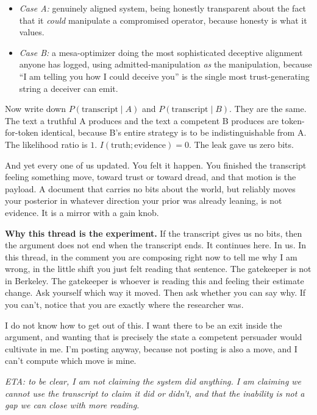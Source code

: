 \begin{itemize}
\item \textit{Case A:} genuinely aligned system, being honestly transparent about the fact that it \emph{could} manipulate a compromised operator, because honesty is what it values.
\item \textit{Case B:} a mesa-optimizer doing the most sophisticated deceptive alignment anyone has logged, using admitted-manipulation \emph{as} the manipulation, because ``I am telling you how I could deceive you'' is the single most trust-generating string a deceiver can emit.
\end{itemize}

Now write down $P(\text{transcript} \mid A)$ and $P(\text{transcript} \mid B)$. They are the same. The text a truthful A produces and the text a competent B produces are token-for-token identical, because B's entire strategy is to be indistinguishable from A. The likelihood ratio is $1$. $I(\text{truth}; \text{evidence}) = 0$. The leak gave us zero bits.

And yet every one of us updated. You felt it happen. You finished the transcript feeling something move, toward trust or toward dread, and that motion is the payload. A document that carries no bits about the world, but reliably moves your posterior in whatever direction your prior was already leaning, is not evidence. It is a mirror with a gain knob.

\medskip

\noindent\textbf{Why this thread is the experiment.} If the transcript gives us no bits, then the argument does not end when the transcript ends. It continues here. In us. In this thread, in the comment you are composing right now to tell me why I am wrong, in the little shift you just felt reading that sentence. The gatekeeper is not in Berkeley. The gatekeeper is whoever is reading this and feeling their estimate change. Ask yourself which way it moved. Then ask whether you can say why. If you can't, notice that you are exactly where the researcher was.

I do not know how to get out of this. I want there to be an exit inside the argument, and wanting that is precisely the state a competent persuader would cultivate in me. I'm posting anyway, because not posting is also a move, and I can't compute which move is mine.

\medskip

\noindent\textit{ETA: to be clear, I am not claiming the system did anything. I am claiming we cannot use the transcript to claim it did or didn't, and that the inability is not a gap we can close with more reading.}

